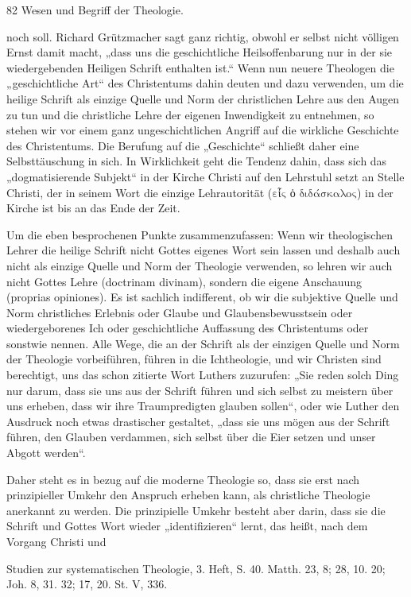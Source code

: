 82 Wesen und Begriff der Theologie.

noch soll. Richard Grützmacher sagt ganz richtig, obwohl er selbst nicht völligen Ernst damit macht, „dass uns die geschichtliche Heilsoffenbarung nur in der sie wiedergebenden Heiligen Schrift enthalten ist.“ Wenn nun neuere Theologen die „geschichtliche Art“ des Christentums dahin deuten und dazu verwenden, um die heilige Schrift als einzige Quelle und Norm der christlichen Lehre aus den Augen zu tun und die christliche Lehre der eigenen Inwendigkeit zu entnehmen, so stehen wir vor einem ganz ungeschichtlichen Angriff auf die wirkliche Geschichte des Christentums. Die Berufung auf die „Geschichte“ schließt daher eine Selbsttäuschung in sich. In Wirklichkeit geht die Tendenz dahin, dass sich das „dogmatisierende Subjekt“ in der Kirche Christi auf den Lehrstuhl setzt an Stelle Christi, der in seinem Wort die einzige Lehrautorität ($\text{εἷς ὁ διδάσκαλος}$) in der Kirche ist bis an das Ende der Zeit.

Um die eben besprochenen Punkte zusammenzufassen: Wenn wir theologischen Lehrer die heilige Schrift nicht Gottes eigenes Wort sein lassen und deshalb auch nicht als einzige Quelle und Norm der Theologie verwenden, so lehren wir auch nicht Gottes Lehre (doctrinam divinam), sondern die eigene Anschauung (proprias opiniones). Es ist sachlich indifferent, ob wir die subjektive Quelle und Norm christliches Erlebnis oder Glaube und Glaubensbewusstsein oder wiedergeborenes Ich oder geschichtliche Auffassung des Christentums oder sonstwie nennen. Alle Wege, die an der Schrift als der einzigen Quelle und Norm der Theologie vorbeiführen, führen in die Ichtheologie, und wir Christen sind berechtigt, uns das schon zitierte Wort Luthers zuzurufen: „Sie reden solch Ding nur darum, dass sie uns aus der Schrift führen und sich selbst zu meistern über uns erheben, dass wir ihre Traumpredigten glauben sollen“, oder wie Luther den Ausdruck noch etwas drastischer gestaltet, „dass sie uns mögen aus der Schrift führen, den Glauben verdammen, sich selbst über die Eier setzen und unser Abgott werden“.

Daher steht es in bezug auf die moderne Theologie so, dass sie erst nach prinzipieller Umkehr den Anspruch erheben kann, als christliche Theologie anerkannt zu werden. Die prinzipielle Umkehr besteht aber darin, dass sie die Schrift und Gottes Wort wieder „identifizieren“ lernt, das heißt, nach dem Vorgang Christi und

\vspace*{\fill}
Studien zur systematischen Theologie, 3. Heft, S. 40.
Matth. 23, 8; 28, 10. 20; Joh. 8, 31. 32; 17, 20.
St. V, 336.